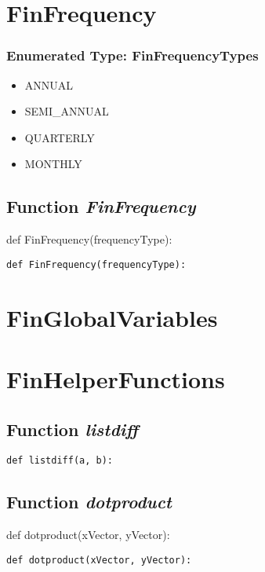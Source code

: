 \documentclass[twoside,11pt]{book}
\begin{document}
\newpage
\section{FinFrequency}

\subsubsection{Enumerated Type: FinFrequencyTypes}
\begin{itemize}
\item{ANNUAL}
\item{SEMI\_ANNUAL}
\item{QUARTERLY}
\item{MONTHLY}
\end{itemize}

\subsection{Function {\it FinFrequency}}
def FinFrequency(frequencyType):

\begin{lstlisting}
def FinFrequency(frequencyType):
\end{lstlisting}

\newpage
\section{FinGlobalVariables}

\newpage
\section{FinHelperFunctions}

\subsection{Function {\it listdiff}}


\begin{lstlisting}
def listdiff(a, b):
\end{lstlisting}

\subsection{Function {\it dotproduct}}
def dotproduct(xVector, yVector):

\begin{lstlisting}
def dotproduct(xVector, yVector):
\end{lstlisting}
\end{document}
